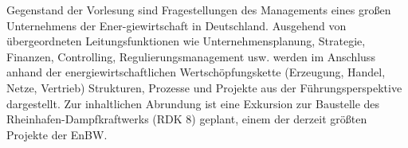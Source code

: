 \begin{course}
\begin{content}
Gegenstand der Vorlesung sind Fragestellungen des Managements eines großen Unternehmens der Ener-giewirtschaft in Deutschland. Ausgehend von übergeordneten Leitungsfunktionen wie Unternehmensplanung, Strategie, Finanzen, Controlling, Regulierungsmanagement usw. werden im Anschluss anhand der energiewirtschaftlichen Wertschöpfungskette (Erzeugung, Handel, Netze, Vertrieb) Strukturen, Prozesse und Projekte aus der Führungsperspektive dargestellt. Zur inhaltlichen Abrundung ist eine Exkursion zur Baustelle des Rheinhafen-Dampfkraftwerks (RDK 8) geplant, einem der derzeit größten Projekte der EnBW.


\end{content}







\end{course}